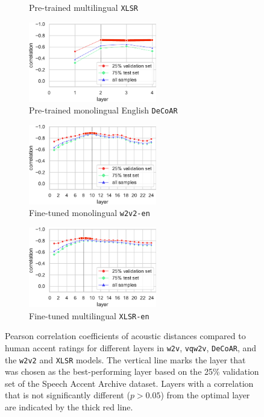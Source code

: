 \documentclass[11pt,a4paper]{article}
\begin{document}
\begin{figure}[ht]
\begin{subfigure}[b]{0.49\textwidth}
         \caption{Pre-trained multilingual \texttt{XLSR}}
         \label{fig:curveXLSRSAA}
     \end{subfigure}
     \par\smallskip
     \begin{subfigure}[b]{0.49\textwidth}
         \centering
         \includegraphics[width=2.2in]{figures/SAA/decoar.pdf}
         \caption{Pre-trained monolingual English \texttt{DeCoAR}}
         \label{fig:curveDECOARSAA}
     \end{subfigure}
     \begin{subfigure}[b]{0.49\textwidth}
         \centering
         \includegraphics[width=2.2in]{figures/SAA/wav2vec2-large-960h.pdf}
         \caption{Fine-tuned monolingual \texttt{w2v2-en}}
         \label{fig:curveW2V2-ENSAA}
      \end{subfigure}
      \par\smallskip
      \begin{subfigure}[b]{0.49\textwidth}
         \centering
         \includegraphics[width=2.2in]{figures/SAA/wav2vec2-large-xlsr-53-english.pdf}
         \caption{Fine-tuned multilingual \texttt{XLSR-en}}
         \label{fig:curveXLSR-ENSAA}
     \end{subfigure}
     \caption{Pearson correlation coefficients of acoustic distances compared to human accent ratings for different layers in \texttt{w2v}, \texttt{vqw2v}, \texttt{DeCoAR}, and the \texttt{w2v2} and \texttt{XLSR} models. The vertical line marks the layer that was chosen as the best-performing layer based on the 25\% validation set of the Speech Accent Archive dataset. Layers with a correlation that is not significantly different ($p > 0.05$) from the optimal layer are indicated by the thick red line.}
     \label{fig:curveSAA}
\end{figure}
\end{document}
